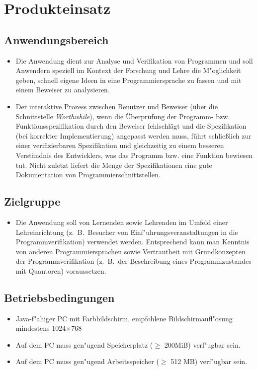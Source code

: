 \section{Produkteinsatz}%

\subsection{Anwendungsbereich}%

\begin{itemize}%
    \item Die Anwendung dient zur Analyse und \see Verifikation von Programmen und soll Anwendern speziell im Kontext der Forschung und Lehre die M"oglichkeit geben, schnell eigene Ideen in eine Programmiersprache zu fassen und mit einem \see Beweiser zu analysieren.%
    \item Der interaktive Prozess zwischen Benutzer und Beweiser (über die Schnittstelle \textit{Worthwhile}), wenn die Überprüfung der Programm- bzw. Funktionsspezifikation durch den Beweiser fehlschlägt und die Spezifikation (bei korrekter Implementierung) angepasst werden muss, führt schließlich zur einer verifizierbaren Spezifikation und gleichzeitig zu einem besseren Verständnis des Entwicklers, was das Programm bzw. eine Funktion bewiesen tut. Nicht zuletzt liefert die Menge der Spezifikationen eine gute Dokumentation von Programmierschnittstellen.%
\end{itemize}%

\subsection{Zielgruppe}%

\begin{itemize}%
    \item Die Anwendung soll von Lernenden sowie Lehrenden im Umfeld einer Lehreinrichtung (z.~B.\ Besucher von Einf"uhrungsveranstaltungen in die Programmverifikation) verwendet werden. Entsprechend kann man Kenntnis von anderen Programmiersprachen sowie Vertrautheit mit Grundkonzepten der Programmverifikation (z.~B.\ der Beschreibung eines \see Programmzustandes mit \see Quantoren) voraussetzen.%
\end{itemize}%

\subsection{Betriebsbedingungen}%

\begin{itemize}%
    \item \see Java-f"ahiger PC mit Farbbildschirm, empfohlene Bildschirmaufl"osung mindestens 1024$\times$768%
    \item Auf dem PC muss gen"ugend Speicherplatz ($\ge$ 200MiB) verf"ugbar sein.%
    \item Auf dem PC muss gen"ugend Arbeitsspeicher ($\ge$ 512 MB) verf"ugbar sein.%
\end{itemize}%

